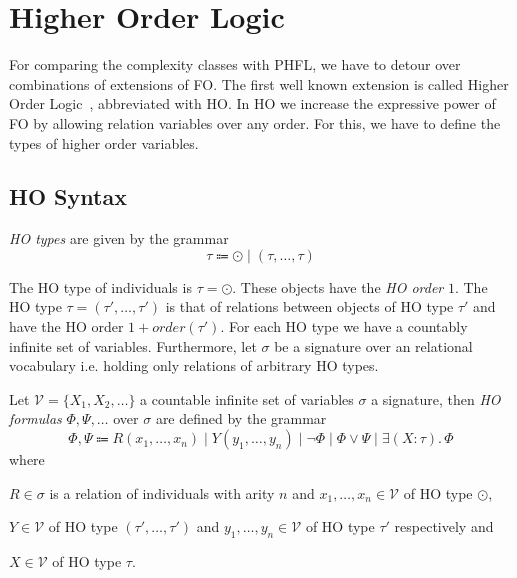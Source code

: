 

\section{Higher Order Logic}\label{sec:higherOrderLogic}

For comparing the complexity classes with PHFL, we have to detour over combinations of extensions of FO. The first well
known extension is called Higher Order Logic~\cite{vanBenthem2001higher}, abbreviated with HO. In HO we
increase the expressive power of FO by allowing relation variables over any order. For this, we have to define the
types of higher order variables.

\subsection{HO Syntax}\label{subsec:hoSyntax}

\begin{definition}
    \emph{HO types} are given by the grammar
    \[ \tau \Coloneqq \odot \mid (\tau, \dots, \tau) \]
\end{definition}

The HO type of individuals is $\tau = \odot$. These objects have the \textit{HO order} $1$. The HO type $\tau = (\tau',
\dots, \tau')$ is that of relations between objects of HO type $\tau'$ and have the HO order $1 + order(\tau')$. For
each HO type we have a countably infinite set of variables. Furthermore, let $\sigma$ be a signature over an
relational vocabulary i.e. holding only relations of arbitrary HO types.

\begin{definition}
    Let $\mathcal{V} = \{X_1, X_2, \dots \}$ a countable infinite set of variables $\sigma$ a signature, then \emph{HO
    formulas} $\Phi, \Psi, \dots$ over $\sigma$ are defined by the grammar
    \[\Phi, \Psi \Coloneqq R(x_1, \dots, x_n) \mid Y(y_1, \dots, y_n) \mid \neg \Phi \mid \Phi \vee \Psi \mid \exists
    (X \colon \tau).\,\Phi\]
    where
    \begin{compactitem}
        \item $R \in \sigma$ is a relation of individuals with arity $n$ and $x_1, \dots, x_n \in \mathcal{V}$ of HO
        type $\odot$,
        \item $Y \in \mathcal{V}$ of HO type $(\tau', \dots, \tau')$ and $y_1, \dots, y_n \in \mathcal{V}$ of HO type
        $\tau'$ respectively and
        \item $X \in \mathcal{V}$ of HO type $\tau$.
    \end{compactitem}
\end{definition}

